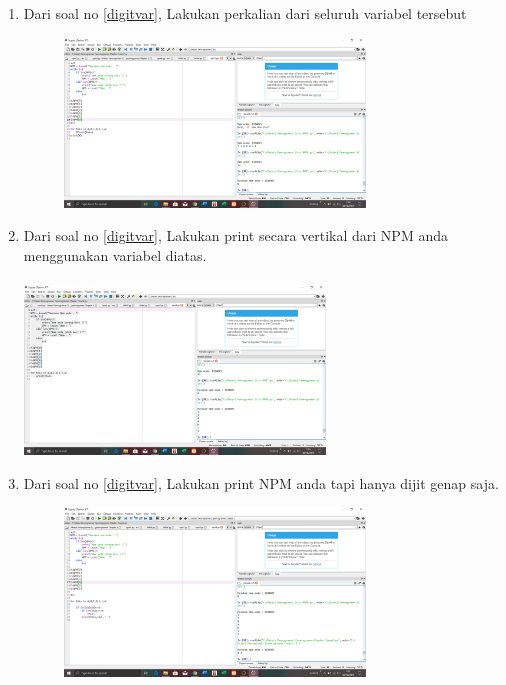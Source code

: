 \documentclass{article}
\begin{document}
\begin{enumerate}
\item 
Dari soal no \ref{digitvar}, Lakukan perkalian dari seluruh variabel tersebut
\begin{figure}[h]
\centerline{\includegraphics[width=8cm]{figures/npm7.png}}
\end{figure}


\item
Dari soal no \ref{digitvar}, Lakukan print secara vertikal dari NPM anda menggunakan variabel diatas. 
\paragraph{}
\centerline{\includegraphics[width=8cm]{figures/npm8.png}}


\item
Dari soal no \ref{digitvar}, Lakukan print NPM anda tapi hanya dijit genap saja. 
\begin{figure}[h]
\centerline{\includegraphics[width=8cm]{figures/npm9.png}}
\end{figure}



\end{enumerate}
\end{document}
